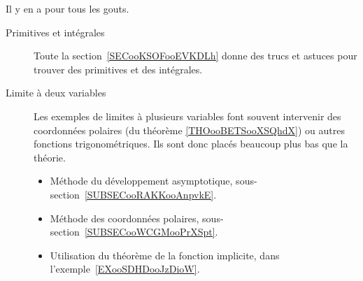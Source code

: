 
        \label{THEMEooLTCIooGDIPnF}

Il y en a pour tous les gouts.

\begin{description}
	\item[Primitives et intégrales]
	      Toute la section~\ref{SECooKSOFooEVKDLh} donne des trucs et astuces pour trouver des primitives et des intégrales.
	\item[Limite à deux variables]

	      Les exemples de limites à plusieurs variables font souvent intervenir des coordonnées polaires (du théorème \ref{THOooBETSooXSQhdX}) ou autres fonctions trigonométriques. Ils sont donc placés beaucoup plus bas que la théorie.
	      \begin{itemize}
		      \item Méthode du développement asymptotique, sous-section~\ref{SUBSECooRAKKooAnpvkE}.
		      \item Méthode des coordonnées polaires, sous-section~\ref{SUBSECooWCGMooPrXSpt}.
		      \item Utilisation du théorème de la fonction implicite, dans l'exemple~\ref{EXooSDHDooJzDioW}.
	      \end{itemize}

\end{description}
